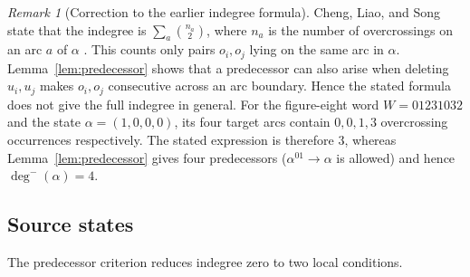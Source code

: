 \documentclass[11pt]{amsart}
\theoremstyle{definition}
\theoremstyle{remark}
\newtheorem{remark}[theorem]{Remark}
\begin{document}
\begin{remark}[Correction to the earlier indegree formula]
Cheng, Liao, and Song state that the indegree is
\(\sum_a\binom{n_a}{2}\), where \(n_a\) is the number of 
overcrossings on an arc \(a\) of $\alpha$
\cite[Proposition~4.2(2)]{ChengLiaoSong2025}.  This counts only pairs
\(o_i,o_j\) lying on the same  arc in $\alpha$.  Lemma~\ref{lem:predecessor} shows
that a predecessor can also arise when deleting \(u_i,u_j\) makes
\(o_i,o_j\) consecutive across an arc boundary.  Hence the stated formula
does not give the full indegree in general.  For the figure-eight word
\(W=01231032\) and the state
\(\alpha=(1,0,0,0)\), its four target arcs contain \(0,0,1,3\)
overcrossing occurrences respectively.  The stated expression is therefore \(3\), whereas
Lemma~\ref{lem:predecessor} gives four predecessors ($\alpha^{01}\to \alpha$ is allowed) and hence
\(\deg^-(\alpha)=4\).
\end{remark}

\begin{center}
\end{center}

\subsection{Source states}\label{sec:source-states}

The predecessor criterion reduces indegree zero to two local conditions.
\end{document}
